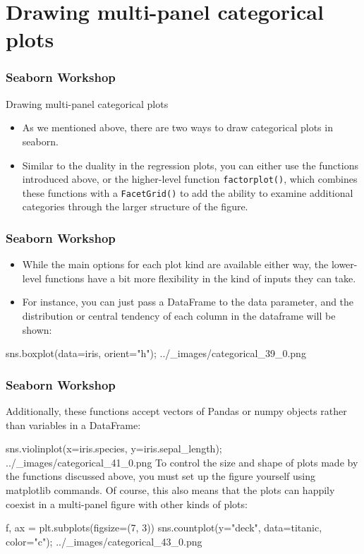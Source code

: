 \section{Drawing multi-panel categorical plots}
\begin{frame}[fragile]
	\frametitle{Seaborn Workshop}
	\large
Drawing multi-panel categorical plots
\begin{itemize}
\item As we mentioned above, there are two ways to draw categorical plots in seaborn. 
\item Similar to the duality in the regression plots, you can either use the functions introduced above, or the higher-level function \texttt{factorplot()}, which combines these functions with a \texttt{FacetGrid()} to add the ability to examine additional categories through the larger structure of the figure.
\end{itemize}

\end{frame}
\begin{frame}[fragile]
	\frametitle{Seaborn Workshop}
	\large
\begin{itemize}
\item While the main options for each plot kind are available either way, the lower-level functions have a bit more flexibility in the kind of inputs they can take.
\item For instance, you can just pass a DataFrame to the data parameter, and the distribution or central tendency of each column in the dataframe will be shown:
\end{itemize}


sns.boxplot(data=iris, orient="h");
../_images/categorical_39_0.png
\end{frame}
\begin{frame}[fragile]
	\frametitle{Seaborn Workshop}
	\large
	
Additionally, these functions accept vectors of Pandas or numpy objects rather than variables in a DataFrame:

sns.violinplot(x=iris.species, y=iris.sepal_length);
../_images/categorical_41_0.png
To control the size and shape of plots made by the functions discussed above, you must set up the figure yourself using matplotlib commands. Of course, this also means that the plots can happily coexist in a multi-panel figure with other kinds of plots:

f, ax = plt.subplots(figsize=(7, 3))
sns.countplot(y="deck", data=titanic, color="c");
../_images/categorical_43_0.png
\end{frame}
